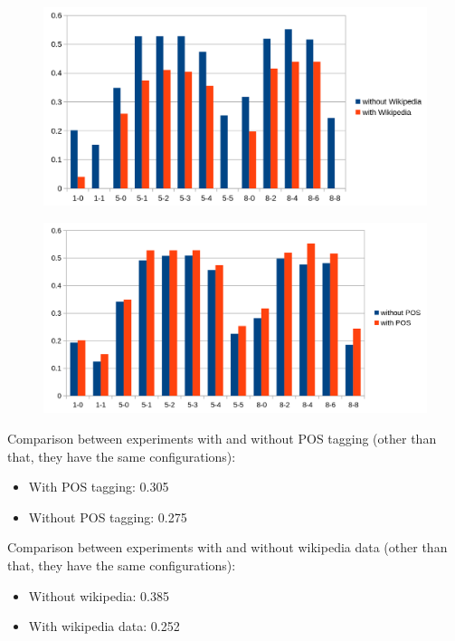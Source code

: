\begin{figure}[ht]
    \centering
    \includegraphics[width=\textwidth]{img/window_wiki_eval.png}
    \caption{}
    \label{window_wiki_eval}
\end{figure}

\begin{figure}[ht]
    \centering
    \includegraphics[width=\textwidth]{img/window_pos_eval.png}
    \caption{}
    \label{window_pos_eval}
\end{figure}

Comparison between experiments with and without POS tagging (other than that, they have the same configurations):
\begin{itemize}
\item With POS tagging: 0.305
\item Without POS tagging: 0.275
\end{itemize}

Comparison between experiments with and without wikipedia data (other than that, they have the same configurations):
\begin{itemize}
\item Without wikipedia: 0.385
\item With wikipedia data: 0.252
\end{itemize}
